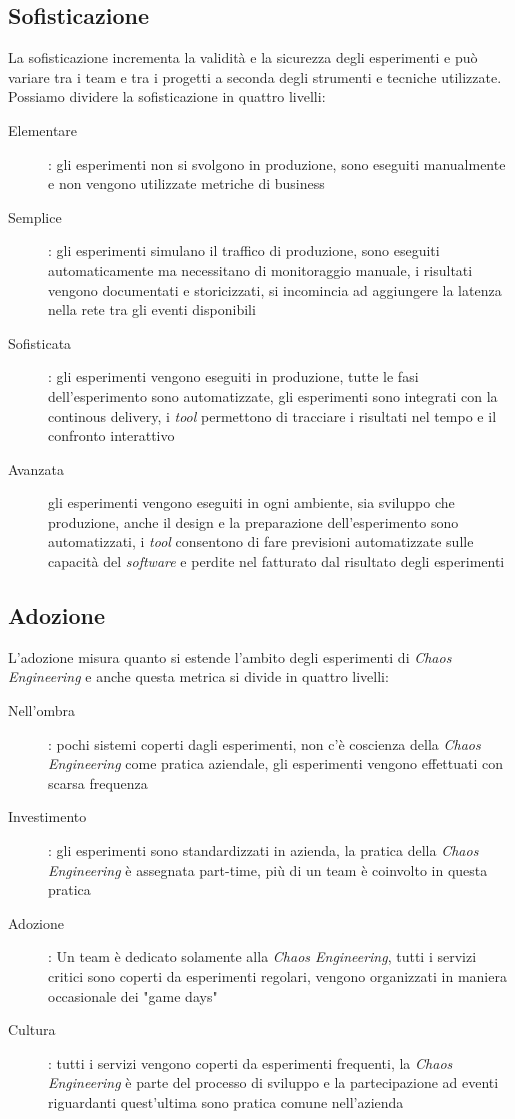 \subsection{Sofisticazione}
La sofisticazione incrementa la validità e la sicurezza degli esperimenti e può variare tra i team e tra i progetti a seconda degli strumenti e tecniche utilizzate.
Possiamo dividere la sofisticazione in quattro livelli:
\begin{description}
    \item[Elementare]: gli esperimenti non si svolgono in produzione, sono eseguiti manualmente e non vengono utilizzate metriche di business
    \item[Semplice]: gli esperimenti simulano il traffico di produzione, sono eseguiti automaticamente ma necessitano di monitoraggio manuale, i risultati vengono documentati e storicizzati, si incomincia ad aggiungere la latenza nella rete tra gli eventi disponibili
    \item[Sofisticata]: gli esperimenti vengono eseguiti in produzione, tutte le fasi dell'esperimento sono automatizzate, gli esperimenti sono integrati con la continous delivery, i \textit{tool} permettono di tracciare i risultati nel tempo e il confronto interattivo
    \item[Avanzata] gli esperimenti vengono eseguiti in ogni ambiente, sia sviluppo che produzione, anche il design e la preparazione dell'esperimento sono automatizzati, i \textit{tool} consentono di fare previsioni automatizzate sulle capacità del \textit{software} e perdite nel fatturato dal risultato degli esperimenti 
\end{description}

\subsection{Adozione}
L'adozione misura quanto si estende l'ambito degli esperimenti di \textit{Chaos Engineering} e anche questa metrica si divide in quattro livelli:
\begin{description}
    \item[Nell'ombra]: pochi sistemi coperti dagli esperimenti, non c'è coscienza della \textit{Chaos Engineering} come pratica aziendale, gli esperimenti vengono effettuati con scarsa frequenza
    \item[Investimento]: gli esperimenti sono standardizzati in azienda, la pratica della \textit{Chaos Engineering} è assegnata part-time, più di un team è coinvolto in questa pratica
    \item[Adozione]: Un team è dedicato solamente alla \textit{Chaos Engineering}, tutti i servizi critici sono coperti da esperimenti regolari, vengono organizzati in maniera occasionale dei "game days"
    \item[Cultura]: tutti i servizi vengono coperti da esperimenti frequenti, la \textit{Chaos Engineering} è parte del processo di sviluppo e la partecipazione ad eventi riguardanti quest'ultima sono pratica comune nell'azienda   
\end{description}

